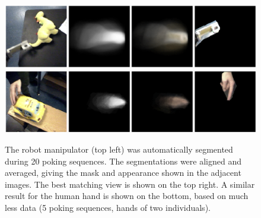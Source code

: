 \begin{figure}[tb]
\begin{center}
\includegraphics[width=\columnwidth]{fig-auto-proto-flipper.eps}\\
\includegraphics[width=\columnwidth]{fig-auto-proto-hand.eps}
\caption{ 
\label{fig:auto-proto-flipper}
%
The robot manipulator (top left) was automatically segmented during 20
poking sequences.  The segmentations were aligned and averaged, giving
the mask and appearance shown in the adjacent images.  The best
matching view is shown on the top right.  A similar result for the
human hand is shown on the bottom, based on much less data (5 poking
sequences, hands of two individuals).
%
}
\end{center}
\end{figure}

